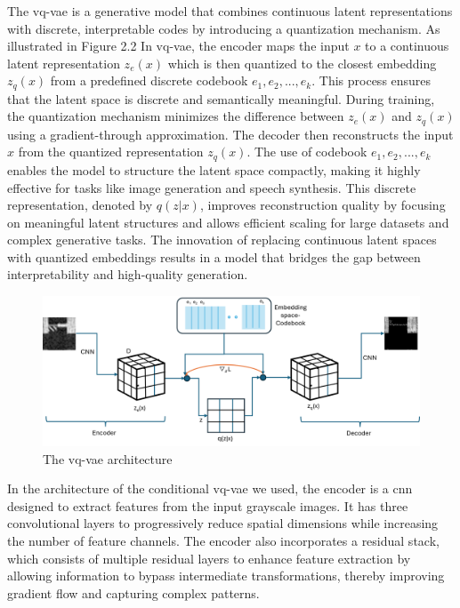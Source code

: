 The \gls{vq-vae} is a generative model that combines continuous latent representations with discrete, interpretable codes by introducing a quantization mechanism. As illustrated in Figure 2.2 In \gls{vq-vae}, the encoder maps the input $x$ to a continuous latent representation $z_e(x)$ which is then quantized to the closest embedding $z_q(x)$ from a predefined discrete codebook ${e_1,e_2,...,e_k}$. This process ensures that the latent space is discrete and semantically meaningful. During training, the quantization mechanism minimizes the difference between $z_e(x)$ and $z_q(x)$ using a gradient-through approximation. The decoder then reconstructs the input $x$ from the quantized representation $z_q(x)$. The use of codebook ${e_1,e_2,...,e_k}$ enables the model to structure the latent space compactly, making it highly effective for tasks like image generation and speech synthesis. This discrete representation, denoted by $q(z|x)$, improves reconstruction quality by focusing on meaningful latent structures and allows efficient scaling for large datasets and complex generative tasks. The innovation of replacing continuous latent spaces with quantized embeddings results in a model that bridges the gap between interpretability and high-quality generation.

\begin{figure}[h]
\includegraphics[width=\textwidth]{figures/vq-vae.png}
\centering
\caption{The \gls{vq-vae} architecture  }
\centering
\end{figure}


In the architecture of the conditional \gls{vq-vae} we used, the encoder is a \gls{cnn} designed to extract features from the input grayscale images. It has three convolutional layers to progressively reduce spatial dimensions while increasing the number of feature channels. The encoder also incorporates a residual stack, which consists of multiple residual layers to enhance feature extraction by allowing information to bypass intermediate transformations, thereby improving gradient flow and capturing complex patterns.

